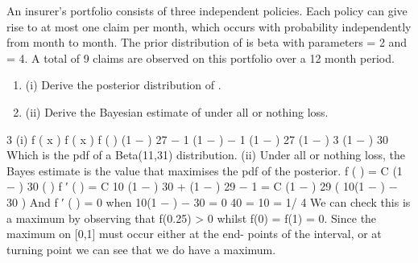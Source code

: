 \documentclass[a4paper,12pt]{article}
\begin{document}
An insurer’s portfolio consists of three independent policies. Each policy can give rise to at most one claim per month, which occurs with probability \theta  independently
from month to month. The prior distribution of \theta  is beta with parameters \alpha  = 2 and
\beta = 4. A total of 9 claims are observed on this portfolio over a 12 month period.

\begin{enumerate}
\item (i)  Derive the posterior distribution of \theta .
\item (ii)  Derive the Bayesian estimate of \theta  under all or nothing loss.
\end{enumerate}


3
(i)
f ( \theta  x ) \propto  f ( x \theta  ) f ( \theta  )
\propto  {} (1 − \theta  ) 27 \theta  \alpha − 1 (1 − \theta  ) \beta− 1
\propto  {} (1 − \theta  ) 27  (1 − \theta  ) 3
\propto  {} (1 − \theta  ) 30
Which is the pdf of a Beta(11,31) distribution.
(ii)
Under all or nothing loss, the Bayes estimate is the value that maximises the
pdf of the posterior.
f ( \theta  ) = C \times  {} (1 − \theta  ) 30
(
)
f ′ ( \theta  ) = C 10  (1 − \theta  ) 30 +  (1 − \theta  ) 29 \times  − 1
= C  (1 − \theta  ) 29 ( 10(1 − \theta  ) − 30 \theta  )
And f ′ ( \theta  ) = 0 when
10(1 − \theta  ) − 30 \theta  = 0
40 \theta  = 10
\theta  = 1/ 4
We can check this is a maximum by observing that f(0.25) > 0 whilst
f(0) = f(1) = 0. Since the maximum on [0,1] must occur either at the end-
points of the interval, or at turning point we can see that we do have a
maximum.
\end{document}
